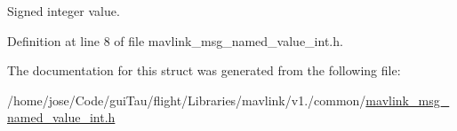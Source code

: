 Signed integer value. 



Definition at line 8 of file mavlink\-\_\-msg\-\_\-named\-\_\-value\-\_\-int.\-h.



The documentation for this struct was generated from the following file\-:\begin{DoxyCompactItemize}
\item 
/home/jose/\-Code/gui\-Tau/flight/\-Libraries/mavlink/v1./common/\hyperlink{mavlink__msg__named__value__int_8h}{mavlink\-\_\-msg\-\_\-named\-\_\-value\-\_\-int.\-h}\end{DoxyCompactItemize}
